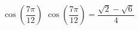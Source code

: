{\label{cos7pi12} $\cos \left( \dfrac{7\pi}{12} \right)$}
{$\cos \left( \dfrac{7\pi}{12} \right) = \dfrac{\sqrt{2} - \sqrt{6}}{4}$}
